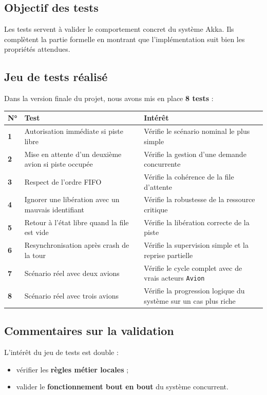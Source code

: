 \documentclass[11pt,a4paper]{article}
\begin{document}
\subsection{Objectif des tests}

Les tests servent à valider le comportement concret du système Akka. Ils complètent la partie formelle en montrant que l'implémentation suit bien les propriétés attendues.

\subsection{Jeu de tests réalisé}

Dans la version finale du projet, nous avons mis en place \textbf{8 tests} :

\begin{longtable}{>{\bfseries}p{0.9cm} p{5.4cm} p{8.1cm}}
\toprule
N° & Test & Intérêt \\
\midrule
1 & Autorisation immédiate si piste libre & Vérifie le scénario nominal le plus simple \\
2 & Mise en attente d'un deuxième avion si piste occupée & Vérifie la gestion d'une demande concurrente \\
3 & Respect de l'ordre FIFO & Vérifie la cohérence de la file d'attente \\
4 & Ignorer une libération avec un mauvais identifiant & Vérifie la robustesse de la ressource critique \\
5 & Retour à l'état libre quand la file est vide & Vérifie la libération correcte de la piste \\
6 & Resynchronisation après crash de la tour & Vérifie la supervision simple et la reprise partielle \\
7 & Scénario réel avec deux avions & Vérifie le cycle complet avec de vrais acteurs \texttt{Avion} \\
8 & Scénario réel avec trois avions & Vérifie la progression logique du système sur un cas plus riche \\
\bottomrule
\end{longtable}

\subsection{Commentaires sur la validation}

L'intérêt du jeu de tests est double :
\begin{itemize}
    \item vérifier les \textbf{règles métier locales} ;
    \item valider le \textbf{fonctionnement bout en bout} du système concurrent.
\end{itemize}
\end{document}
